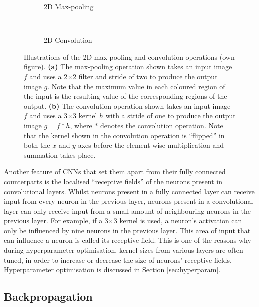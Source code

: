 \begin{figure}[t]
    \centering
    \begin{subfigure}[t]{0.43\textwidth}
        \centering
        
    \vspace*{1mm}
    \caption{2D Max-pooling}
    \end{subfigure}
    ~
    \begin{subfigure}[t]{0.55\textwidth}
        \centering
        
        \vspace*{1mm}
        \caption{2D Convolution}
    \end{subfigure}
    \caption{Illustrations of the 2D max-pooling and convolution operations (own figure). \textbf{(a)} The max-pooling operation shown takes an input image $f$ and uses a 2$\times$2 filter and stride of two to produce the output image $g$. Note that the maximum value in each coloured region of the input is the resulting value of the corresponding regions of the output. \textbf{(b)} The convolution operation shown takes an input image $f$ and uses a 3$\times$3 kernel $h$ with a stride of one to produce the output image $g=f\ast h$, where $\ast$ denotes the convolution operation. Note that the kernel shown in the convolution operation is ``flipped'' in both the $x$ and $y$ axes before the element-wise multiplication and summation takes place.}
    \label{fig:operations}
\end{figure}

Another feature of CNNs that set them apart from their fully connected counterparts is the localised ``receptive fields'' of the neurons present in convolutional layers. Whilst neurons present in a fully connected layer can receive input from every neuron in the previous layer, neurons present in a convolutional layer can only receive input from a small amount of neighbouring neurons in the previous layer. For example, if a 3$\times$3 kernel is used, a neuron's activation can only be influenced by nine neurons in the previous layer. This area of input that can influence a neuron is called its receptive field. This is one of the reasons why during hyperparameter optimisation, kernel sizes from various layers are often tuned, in order to increase or decrease the size of neurons' receptive fields. Hyperparameter optimisation is discussed in Section \ref{sec:hyperparam}.

\subsection{Backpropagation}
\label{sec:backprop}

